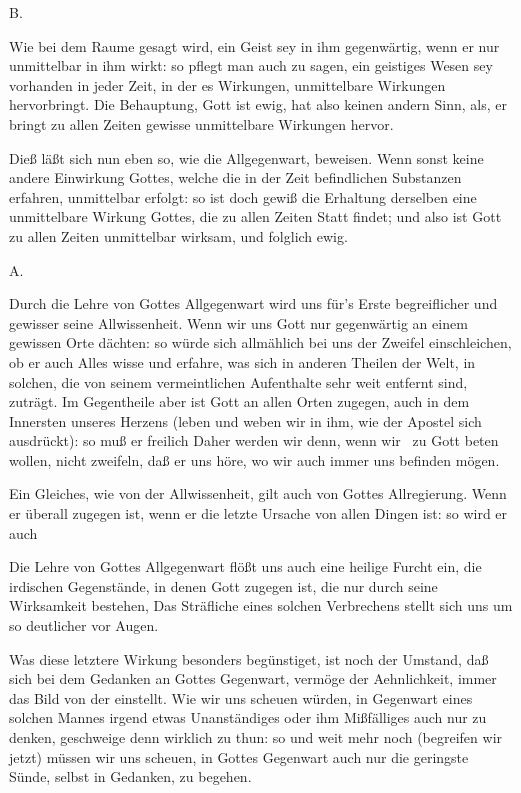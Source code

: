 \begin{aufza}
\end{aufza}

\vabst B.~
\begin{aufza}
\item Wie bei dem Raume gesagt wird, ein Geist sey in ihm gegenwärtig, wenn er nur unmittelbar in ihm wirkt: so pflegt man auch zu sagen, ein geistiges Wesen sey vorhanden in jeder Zeit, in der es Wirkungen, unmittelbare Wirkungen hervorbringt. Die Behauptung, Gott ist ewig, hat also keinen andern Sinn, als, er bringt zu allen Zeiten gewisse unmittelbare Wirkungen hervor.
\item Dieß läßt sich nun eben so, wie die Allgegenwart, beweisen. Wenn sonst keine andere Einwirkung Gottes, welche die in der Zeit befindlichen Substanzen erfahren, unmittelbar erfolgt: so ist doch gewiß die Erhaltung derselben eine unmittelbare Wirkung Gottes, die zu allen Zeiten Statt findet; und also ist Gott zu allen Zeiten unmittelbar wirksam, und folglich ewig.~
\end{aufza}

A.~
\begin{aufza}
\item Durch die Lehre von Gottes Allgegenwart wird uns für's Erste begreiflicher und gewisser seine Allwissenheit. Wenn wir uns Gott nur gegenwärtig an einem gewissen Orte dächten: so würde sich allmählich bei uns der Zweifel einschleichen, ob er auch Alles wisse und erfahre, was sich in anderen Theilen der Welt, in solchen, die von seinem vermeintlichen Aufenthalte sehr weit entfernt sind, zuträgt. Im Gegentheile aber ist Gott an allen Orten zugegen, auch in dem Innersten unseres Herzens (leben und weben wir in ihm, wie der Apostel sich ausdrückt): so muß er freilich  Daher werden wir denn, wenn wir \zB\ zu Gott beten wollen, nicht zweifeln, daß er uns höre, wo wir auch immer uns befinden mögen.
\item Ein Gleiches, wie von der Allwissenheit, gilt auch von Gottes Allregierung. Wenn er überall zugegen ist, wenn er die letzte Ursache von allen Dingen ist: so wird er auch 
\item Die Lehre von Gottes Allgegenwart flößt uns auch eine heilige Furcht ein, die irdischen Gegenstände, in denen Gott zugegen ist, die nur durch seine Wirksamkeit bestehen,  Das Sträfliche eines solchen Verbrechens stellt sich uns um so deutlicher vor Augen.
\item Was diese letztere Wirkung besonders begünstiget, ist noch der Umstand, daß sich bei dem Gedanken an Gottes Gegenwart, vermöge der Aehnlichkeit, immer das Bild von der  einstellt. Wie wir uns scheuen würden, in Gegenwart eines solchen Mannes irgend etwas Unanständiges oder ihm Mißfälliges auch nur zu denken, geschweige denn wirklich zu thun: so und weit mehr noch (begreifen wir jetzt) müssen wir uns scheuen, in Gottes Gegenwart auch nur die geringste Sünde, selbst in Gedanken, zu begehen.~
\end{aufza}

